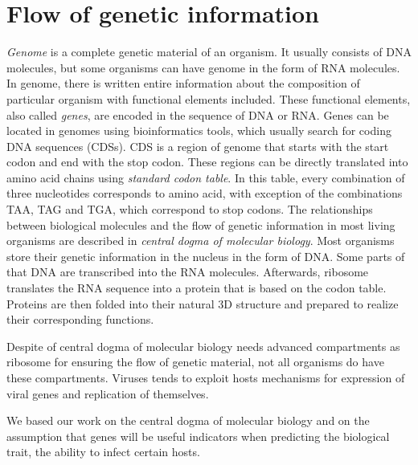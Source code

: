 \section{Flow of genetic information}
\emph{Genome} is a complete genetic material of an organism.
It usually consists of DNA molecules, but some organisms can have genome in the form of RNA molecules.
In genome, there is written entire information about the composition of particular organism with functional elements included.
These functional elements, also called \emph{genes}, are encoded in the sequence of DNA or RNA.
Genes can be located in genomes using bioinformatics tools, which usually search for coding DNA sequences (CDSs).
CDS is a region of genome that starts with the start codon and end with the stop codon.
These regions can be directly translated into amino acid chains using \emph{standard codon table}.
In this table, every combination of three nucleotides corresponds to amino acid, with exception of the combinations TAA, TAG and TGA, which correspond to stop codons.
The relationships between biological molecules and the flow of genetic information in most living organisms are described in \emph{central dogma of molecular biology}.
Most organisms store their genetic information in the nucleus in the form of DNA.
Some parts of that DNA are transcribed into the RNA molecules.
Afterwards, ribosome translates the RNA sequence into a protein that is based on the codon table.
Proteins are then folded into their natural 3D structure and prepared to realize their corresponding functions.

Despite of central dogma of molecular biology needs advanced compartments as ribosome for ensuring the flow of genetic material, not all organisms do have these compartments.
Viruses tends to exploit hosts mechanisms for expression of viral genes and replication of themselves.

We based our work on the central dogma of molecular biology and on the assumption that genes will be useful indicators when predicting the biological trait, the ability to infect certain hosts.

